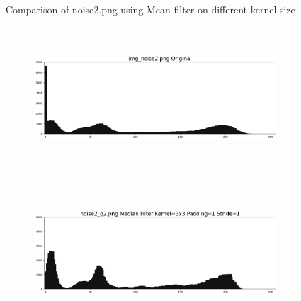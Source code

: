 \documentclass[12pt,a4paper]{report}
\begin{document}
\begin{figure}[!htb]
\begin{minipage}{\linewidth}
  \caption{Comparison of noise2.png using Mean filter on different kernel size}
  \end{minipage}

\end{figure}
\begin{figure}[!htb]
  \begin{minipage}{\linewidth}
    \centering
    \begin{subfigure}{1\textwidth}
      \includegraphics[height=5.3cm]{result_img/noise2_his.png}
    \end{subfigure}
    \begin{subfigure}{1\textwidth}
      \includegraphics[height=5.3cm]{output/noise2_q2_K3P1_his.png}
    \end{subfigure}


\end{minipage}
\end{figure}
\end{document}
